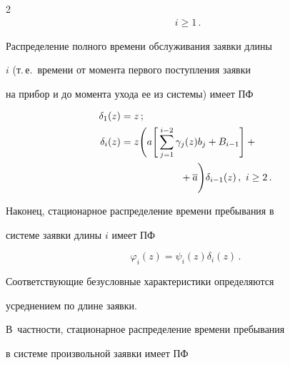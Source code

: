 \begin{multicols}{2}
\begin{multline}
\ \ i\ge 1\,.


\label{e19p}


\end{multline}





Распределение полного времени обслуживания заявки длины


$i$ (т.\,е.\ времени от момента первого поступления заявки


на прибор и до момента ухода ее из системы) имеет ПФ


\begin{align}


\delta_1(z) &= z\,;\notag\\


\delta_i(z) &  =z \Bigg(


a \Bigg[


\sum_{j=1}^{i-2} \gamma_{j}(z) b_j + B_{i-1}


\Bigg ] +{} \label{e20p}\\


&\hspace*{60pt}{}+ \a


\Bigg)


\delta_{i-1}(z)\,,


\ i\ge 2\,.\notag


\end{align}





Наконец, стационарное распределение времени пребывания в


системе заявки длины $i$ имеет ПФ


\begin{equation}


\varphi_i(z)    = \psi_i(z) \delta_i(z)\,.


\label{e21p}


\end{equation}





Соответствующие безусловные характеристики определяются


усреднением по длине заявки.


В~частности, стационарное распределение времени пребывания


в системе произвольной заявки имеет ПФ


\begin{equation}



\end{equation}
\end{multicols}
